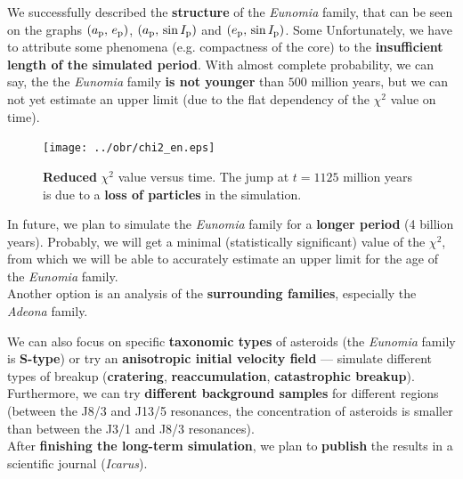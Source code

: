 \documentclass{beamer}
\newlength{\sep}
\newlength{\vyska}
\newlength{\vyskaC}
\newlength{\side}
\newlength{\newparskip}
\begin{document}
\begin{frame}
\begin{columns}[t]
\begin{column}{\side}
\begin{tcolorbox}[title=Age of the \textit{Eunomia} family\vphantom{Úy},height=0.75\vyskaC]
We successfully described the \textbf{structure} of the \textit{Eunomia} family, that can be seen on the graphs $(a_{\rm p},\,e_{\rm p})$, $(a_{\rm p},\,\sin I_{\rm p})$ and $(e_{\rm p},\,\sin I_{\rm p})$. Some Unfortunately, we have to attribute some phenomena (e.g. compactness of the core) to the \textbf{insufficient length of the simulated period}. With almost complete probability, we can say, the the \textit{Eunomia} family \textbf{is not younger} than $500$ million years, but we can not yet estimate an upper limit (due to the flat dependency of the $\chi^2$ value on time).\\[\newparskip]

\vspace{0.01cm}

	\begin{figure}
		\centering
		\texttt{[image: ../obr/chi2\_en.eps]}
		\captionsetup{width=0.8\linewidth}
		\caption{\textbf{Reduced} $\chi^2$ value versus time. The jump at $t=1125$ million years is due to a \textbf{loss of particles} in the simulation.}
	\end{figure}

\vspace{0.3cm}

	In future, we plan to simulate the \textit{Eunomia} family for a \textbf{longer period} (4 billion years). Probably, we will get a minimal (statistically significant) value of the $\chi^2$, from which we will be able to accurately estimate an upper limit for the age of the \textit{Eunomia} family. \\[\newparskip]   

	Another option is an analysis of the \textbf{surrounding families}, especially the \textit{Adeona} family. 

	We can also focus on specific \textbf{taxonomic types} of asteroids (the \textit{Eunomia} family is \textbf{S-type}) or try an \textbf{anisotropic initial velocity field} --- simulate different types of breakup (\textbf{cratering}, \textbf{reaccumulation}, \textbf{catastrophic breakup}). Furthermore, we can try \textbf{different background samples} for different regions (between the J8/3 and J13/5 resonances, the concentration of asteroids is smaller than between the J3/1 and J8/3 resonances).\\[\newparskip]

	After \textbf{finishing the long-term simulation}, we plan to \textbf{publish} the results in a scientific journal (\textit{Icarus}).

\end{tcolorbox}
\vspace{\sep}
\begin{tcolorbox}[title=References\vphantom{Úy},height=0.25\vyskaC]
	\printbibliography


\end{tcolorbox}
\end{column}
\end{columns}
\end{frame}
\end{document}
